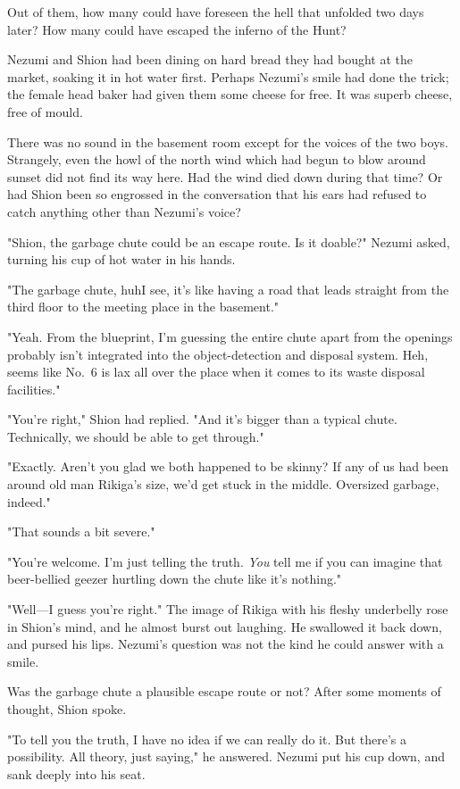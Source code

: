 Out of them, how many could have foreseen the hell that unfolded two
days later? How many could have escaped the inferno of the Hunt?

Nezumi and Shion had been dining on hard bread they had bought at the
market, soaking it in hot water first. Perhaps Nezumi's smile had done
the trick; the female head baker had given them some cheese for free. It
was superb cheese, free of mould.

There was no sound in the basement room except for the voices of the two
boys. Strangely, even the howl of the north wind which had begun to blow
around sunset did not find its way here. Had the wind died down during
that time? Or had Shion been so engrossed in the conversation that his
ears had refused to catch anything other than Nezumi's voice?

"Shion, the garbage chute could be an escape route. Is it doable?"
Nezumi asked, turning his cup of hot water in his hands.

"The garbage chute, huh\el I see, it's like having a road that leads
straight from the third floor to the meeting place in the basement."

"Yeah. From the blueprint, I'm guessing the entire chute apart from the
openings probably isn't integrated into the object-detection and
disposal system. Heh, seems like No.~6 is lax all over the place when it
comes to its waste disposal facilities."

"You're right," Shion had replied. "And it's bigger than a typical
chute. Technically, we should be able to get through."

"Exactly. Aren't you glad we both happened to be skinny? If any of us
had been around old man Rikiga's size, we'd get stuck in the middle.
Oversized garbage, indeed."

"That sounds a bit severe."

"You're welcome. I'm just telling the truth. \emph{You} tell me if you can
imagine that beer-bellied geezer hurtling down the chute like it's
nothing."

"Well---I guess you're right." The image of Rikiga with his fleshy
underbelly rose in Shion's mind, and he almost burst out laughing. He
swallowed it back down, and pursed his lips. Nezumi's question was not
the kind he could answer with a smile.

Was the garbage chute a plausible escape route or not? After some
moments of thought, Shion spoke.

"To tell you the truth, I have no idea if we can really do it. But
there's a possibility. All theory, just saying," he answered. Nezumi put
his cup down, and sank deeply into his seat.

